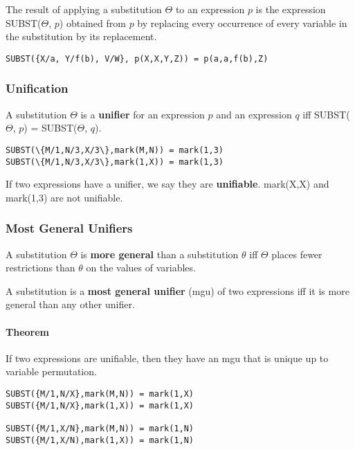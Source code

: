 The result of applying a substitution $\Theta$ to an expression $p$ is the
expression SUBST($\Theta$, $p$) obtained from $p$ by replacing every occurrence
of every variable in the substitution by its replacement.

\texttt{SUBST(\{X/a, Y/f(b), V/W\}, p(X,X,Y,Z)) = p(a,a,f(b),Z)}

\subsubsection{Unification}
A substitution $\Theta$ is a \textbf{unifier} for an expression $p$ and an
expression $q$ iff SUBST($\Theta$, $p$) = SUBST($\Theta$, $q$).
\begin{lstlisting}
SUBST(\{M/1,N/3,X/3\},mark(M,N)) = mark(1,3)
SUBST(\{M/1,N/3,X/3\},mark(1,X)) = mark(1,3)
\end{lstlisting}

If two expressions have a unifier, we say they are \textbf{unifiable}.
mark(X,X) and mark(1,3) are not unifiable.

\subsubsection{Most General Unifiers}
A substitution $\Theta$ is \textbf{more general} than a substitution $\theta$
iff $\Theta$ places fewer restrictions than $\theta$ on the values of
variables.

A substitution is a \textbf{most general unifier} (mgu) of two expressions iff
it is more general than any other unifier.

\paragraph{Theorem} If two expressions are unifiable, then they have an mgu
that is unique up to variable permutation.
\begin{lstlisting}
SUBST({M/1,N/X},mark(M,N)) = mark(1,X)
SUBST({M/1,N/X},mark(1,X)) = mark(1,X)

SUBST({M/1,X/N},mark(M,N)) = mark(1,N)
SUBST({M/1,X/N),mark(1,X)) = mark(1,N)
\end{lstlisting}

